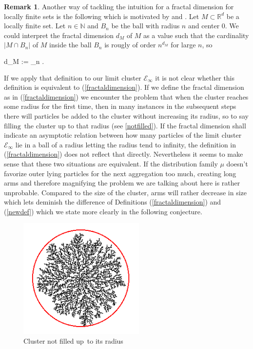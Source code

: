 \documentclass[12pt,a4paper]{scrartcl}
\newcommand{\R}{\mathbb{R}} %
\newcommand{\N}{\mathbb{N}} %
\newcommand{\E}{\mathcal{E}} %
\newcommand{\1}{\mathbbm{1}}
\theoremstyle{definition}
\newtheorem{remark}{Remark}[subsection]
\numberwithin{equation}{section}
\begin{document}
\begin{remark} \label{altdim}
	Another way of tackling the intuition for a fractal dimension for locally finite sets is the following which is motivated by \cite[Part II, Section 1, Page 98]{fractalwinter} and \cite[Page 83]{lawler}. Let $M\subset \R^d$ be a locally finite set. Let $n\in\N$ and $B_n$ be the ball with radius $n$ and center $0$. We could interpret the fractal dimension $d_M$ of $M$ as a value such that the cardinality $|M\cap B_n|$ of $M$ inside the ball $B_n$ is rougly of order $n^{d_M}$ for large $n$, so 
	\begin{flalign} \label{newdef}
		d_M := \liminf_{n\to\infty} . 
	\end{flalign}
	If we apply that definition to our limit cluster $\E_\infty$ it is not clear whether this definition is equivalent to (\ref{fractaldimension}). If we define the fractal dimension as in (\ref{fractaldimension}) we encounter the problem that when the cluster reaches some radius for the first time, then in many instances in the subsequent steps there will particles be added to the cluster without increasing its radius, so to say \glqq $\text{filling}$\grqq\ the cluster up to that radius (see \autoref{notfilled}). If the fractal dimension shall indicate an asymptotic relation between how many particles of the limit cluster $\E_\infty$ lie in a ball of a radius letting the radius tend to infinity, the definition in (\ref{fractaldimension}) does not reflect that directly. Nevertheless it seems to make sense that these two situations are equivalent. If the distribution family $\mu$ doesn't favorize outer lying particles for the next aggregation too much, creating long arms and therefore magnifying the problem we are talking about here is rather unprobable. Compared to the size of the cluster, arms will rather decrease in size which lets deminish the difference of Definitions (\ref{fractaldimension}) and (\ref{newdef}) which we state more clearly in the following conjecture. \\
	
\end{remark}

\begin{figure}[]
	\centering
	\includegraphics[height=6cm]{images/fractal_range/5.png}
	\caption{Cluster not \glqq filled up\grqq\ to its radius} \label{notfilled}
\end{figure}
\end{document}
